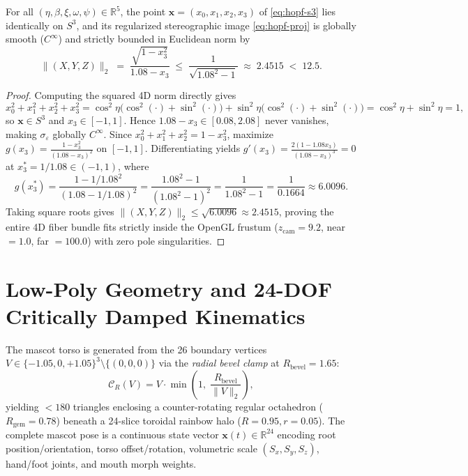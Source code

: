 \begin{theorem}
\label{thm:hopf-bound}
For all $(\eta, \beta, \xi, \omega, \psi) \in \mathbb{R}^5$, the point $\mathbf{x} = (x_0, x_1, x_2, x_3)$ of \eqref{eq:hopf-s3} lies identically on $S^3$, and its regularized stereographic image \eqref{eq:hopf-proj} is globally smooth ($C^\infty$) and strictly bounded in Euclidean norm by
\begin{equation}
\|(X, Y, Z)\|_2 \;=\; \frac{\sqrt{1 - x_3^2}}{1.08 - x_3} \;\le\; \frac{1}{\sqrt{1.08^2 - 1}} \;\approx\; 2.4515 \;<\; 12.5.
\end{equation}
\end{theorem}

\begin{proof}
Computing the squared 4D norm directly gives
\[
x_0^2 + x_1^2 + x_2^2 + x_3^2 = \cos^2\eta\big(\cos^2(\cdot) + \sin^2(\cdot)\big) + \sin^2\eta\big(\cos^2(\cdot) + \sin^2(\cdot)\big) = \cos^2\eta + \sin^2\eta = 1,
\]
so $\mathbf{x} \in S^3$ and $x_3 \in [-1, 1]$. Hence $1.08 - x_3 \in [0.08, 2.08]$ never vanishes, making $\sigma_\varepsilon$ globally $C^\infty$. Since $x_0^2 + x_1^2 + x_2^2 = 1 - x_3^2$, maximize $g(x_3) = \frac{1 - x_3^2}{(1.08 - x_3)^2}$ on $[-1, 1]$. Differentiating yields $g'(x_3) = \frac{2(1 - 1.08 x_3)}{(1.08 - x_3)^3} = 0$ at $x_3^* = 1/1.08 \in (-1, 1)$, where
\[
g(x_3^*) = \frac{1 - 1/1.08^2}{(1.08 - 1/1.08)^2} = \frac{1.08^2 - 1}{(1.08^2 - 1)^2} = \frac{1}{1.08^2 - 1} = \frac{1}{0.1664} \approx 6.0096.
\]
Taking square roots gives $\|(X, Y, Z)\|_2 \le \sqrt{6.0096} \approx 2.4515$, proving the entire 4D fiber bundle fits strictly inside the OpenGL frustum ($z_{\mathrm{cam}} = 9.2$, near $= 1.0$, far $= 100.0$) with zero pole singularities.
\end{proof}

\section{Low-Poly Geometry and 24-DOF Critically Damped Kinematics}

\begin{definition}
The mascot torso is generated from the 26 boundary vertices $V \in \{-1.05, 0, +1.05\}^3 \setminus \{(0,0,0)\}$ via the \emph{radial bevel clamp} at $R_{\mathrm{bevel}} = 1.65$:
\begin{equation}
\mathcal{C}_{R}(V) = V \cdot \min\!\left(1,\; \frac{R_{\mathrm{bevel}}}{\|V\|_2}\right),
\end{equation}
yielding $< 180$ triangles enclosing a counter-rotating regular octahedron ($R_{\mathrm{gem}} = 0.78$) beneath a 24-slice toroidal rainbow halo ($R = 0.95, r = 0.05$). The complete mascot pose is a continuous state vector $\mathbf{x}(t) \in \mathbb{R}^{24}$ encoding root position/orientation, torso offset/rotation, volumetric scale $(S_x, S_y, S_z)$, hand/foot joints, and mouth morph weights.
\end{definition}

